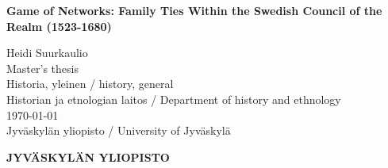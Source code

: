 %
\begin{titlepage}
    \mbox{}\vfill
    \begin{center}
        {\bf\Large Game of Networks: Family Ties Within the Swedish Council of the Realm (1523-1680)}\\
        \vfill
        \begin{flushright}
            Heidi Suurkaulio\\[4pt]
            Master's thesis\\[4pt]%
            Historia, yleinen / history, general\\[4pt]
            Historian ja etnologian laitos / Department of history and ethnology\\[4pt]
            \today\\[4pt]
            Jyväskylän yliopisto / University of Jyväskylä
        \end{flushright}
    \end{center}
\end{titlepage}

\thispagestyle{empty}

{\bf\Large JYVÄSKYLÄN YLIOPISTO}

